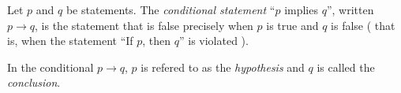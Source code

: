 \guard






\begin{defn}
\label{defn:conditionalStatement}
  Let $p$ and $q$ be statements.
  The \emph{conditional statement} ``$p$ implies $q$'', written $p \rightarrow q$, is the statement that is false precisely when $p$ is true and $q$ is false ( that is, when the statement ``If $p$, then $q$'' is violated ).

  In the conditional $p\rightarrow q$, $p$ is refered to as the \emph{hypothesis} and $q$ is called the \emph{conclusion}.
\end{defn}
